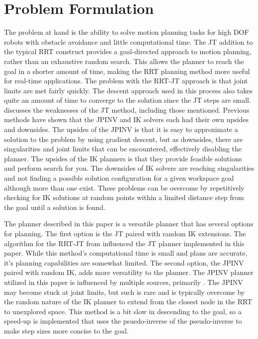 \documentclass[conference]{IEEEtran} \usepackage[T1]{fontenc} \usepackage[backend=biber, style=ieee]{biblatex}
\begin{document}
\section{Problem Formulation} \label{Problem Formulation}

The problem at hand is the ability to solve motion planning tasks for high DOF robots with obstacle avoidance and little computational time. The JT addition to the typical RRT
construct provides a goal-directed approach to motion planning, rather than an exhaustive random search. This allows the planner to reach the goal in a shorter amount of time, 
making the RRT planning method more useful for real-time applications. The problem with the RRT-JT approach is that joint limits are met fairly quickly. The descent approach used 
in this process also takes quite an amount of time to converge to the solution since the JT steps are small. \cite{humanoid_motion_planning} discusses the weaknesses of the JT 
method, including those mentioned. Previous methods have shown that the JPINV and IK solvers each had their own upsides and downsides. The upsides of the JPINV is that it is easy 
to approximate a solution to the problem by using gradient descent, but as downsides, there are singularities and joint limits that can be encountered, effectively disabling the 
planner. The upsides of the IK planners is that they provide feasible solutions and perform search for you. The downsides of IK solvers are reaching singularities and not finding a 
possible solution configuration for a given workspace goal although more than one exist. These problems can be overcome by repetitively checking for IK solutions at random points 
within a limited distance step from the goal until a solution is found. 

The planner described in this paper is a versatile planner that has several options for planning. The first option is the JT paired with random IK extensions. The algorithm 
for the RRT-JT from \cite{random_planner_wo_ik} influenced the JT planner implemented in this paper. While this method's computational time is small and plans are accurate, it's 
planning capabilities are somewhat limited. The second option, the JPINV paired with random IK, adds more versatility to the planner. The JPINV planner utilized in this paper is 
influenced by multiple sources, primarily \cite{humanoid_motion_planning}. The JPINV may become stuck at joint limits, but such is rare and is typically overcome by the random 
nature of the IK planner to extend from the closest node in the RRT to unexplored space. This method is a bit slow in descending to the goal, so a speed-up is implemented
that uses the psuedo-inverse of the pseudo-inverse to make step sizes more concise to the goal.
\end{document}
